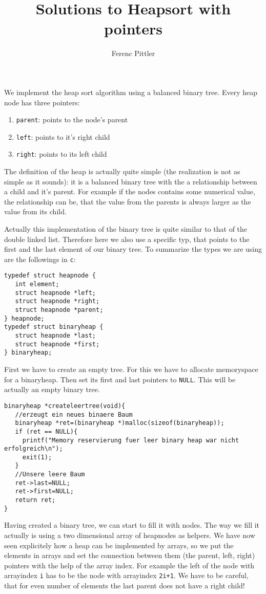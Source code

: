 \documentclass{article}[12pt]
\title{Solutions to Heapsort with pointers}
\author{Ferenc Pittler}
\begin{document}
\maketitle
We implement the heap sort algorithm using a balanced binary tree.
Every heap node has three pointers:
\begin{enumerate}
\item \texttt{parent}: points to the node's parent
\item \texttt{left}: points to it's right child
\item \texttt{right}: points to its left child
\end{enumerate}
The definition of the heap is actually quite simple (the realization 
is not as simple as it sounds): it is a balanced binary tree
with the a relationship between a child and it's parent. 
For example if the nodes contains some numerical value,
the relationship can be, that the value from the parents
is always larger as the value from its child.

Actually this implementation of the binary tree is quite similar to 
that of the double linked list. Therefore here we also use a specific 
typ, that points to the first and the last element of our binary tree.
To summarize the types we are using are the followings in \texttt{c}:
\begin{lstlisting}
typedef struct heapnode {
   int element;
   struct heapnode *left;
   struct heapnode *right;
   struct heapnode *parent;
} heapnode;
typedef struct binaryheap {
   struct heapnode *last;
   struct heapnode *first;
} binaryheap;
\end{lstlisting}
First we have to create an empty tree.
For this we have to allocate memoryspace for a binaryheap.
Then set its first and last pointers to \texttt{NULL}. This
will be actually an empty binary tree.
\begin{lstlisting}
binaryheap *createleertree(void){
   //erzeugt ein neues binaere Baum
   binaryheap *ret=(binaryheap *)malloc(sizeof(binaryheap));
   if (ret == NULL){
     printf("Memory reservierung fuer leer binary heap war nicht erfolgreich\n");
     exit(1);
   }
   //Unsere leere Baum
   ret->last=NULL;
   ret->first=NULL;
   return ret;
}
\end{lstlisting}
Having created a binary tree, we can start to fill it with nodes.
The way we fill it actually is using a two dimensional array of heapnodes
as helpers. We have now seen explicitely how a heap can be implemented by arrays, so we put the elements
in arrays and set the connection between them  (the parent, left, right)
pointers with the help of the array index. For example
the left of the node with arrayindex \texttt{i} has to be the node
with  arrayindex \texttt{2i+1}. We have to be careful, that for even
number of elements the last parent does not have a right child!
\end{document}

